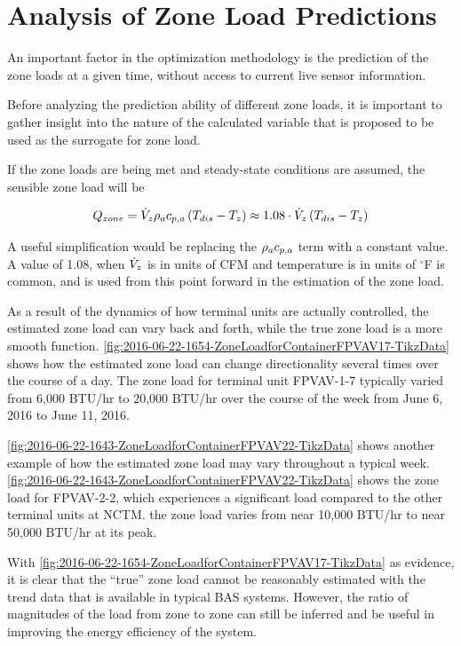 \section{Analysis of Zone Load Predictions}

An important factor in the optimization methodology is the prediction of the zone loads at a given time, without access to current live sensor information. 

Before analyzing the prediction ability of different zone loads, it is important to gather insight into the nature of the calculated variable that is proposed to be used as the surrogate for zone load.   

If the zone loads are being met and steady-state conditions are assumed, the sensible zone load will be

\begin{equation}
    Q_{zone}=\dot{V}_{z} \rho_a c_{p,a}{} \left(T_{dis}-T_{z} \right) \approx 1.08 \cdot \dot{V}_{z}\left(T_{dis}-T_{z} \right)
\end{equation}

A useful simplification would be replacing the \(\rho_a c_{p,a}{}\) term with a constant value. A value of 1.08, when \(\dot{V}_{z}\) is in units of CFM and temperature is in units of \(^\circ\)F is common, and is used from this point forward in the estimation of the zone load.

As a result of the dynamics of how  terminal units are actually controlled, the estimated zone load can vary back and forth, while the true zone load is a more smooth function. \figref{} \ref{fig:2016-06-22-1654-ZoneLoadforContainerFPVAV17-TikzData} shows how the estimated zone load can change directionality several times over the course of a day. The zone load for terminal unit FPVAV-1-7 typically varied from 6,000 BTU/hr to 20,000 BTU/hr over the course of the week from June 6, 2016 to June 11, 2016.

\figref{} \ref{fig:2016-06-22-1643-ZoneLoadforContainerFPVAV22-TikzData} shows another example of how the estimated zone load may vary throughout a typical week. \figref{} \ref{fig:2016-06-22-1643-ZoneLoadforContainerFPVAV22-TikzData} shows the zone load for FPVAV-2-2, which experiences a significant load compared to the other terminal units at NCTM. the zone load varies from near 10,000 BTU/hr to near 50,000 BTU/hr at its peak.

With \figref{} \ref{fig:2016-06-22-1654-ZoneLoadforContainerFPVAV17-TikzData} as evidence, it is clear that the ``true'' zone load cannot be reasonably estimated with the trend data that is available in typical BAS systems. However, the ratio of magnitudes of the load from zone to zone can still be inferred and be useful in improving the energy efficiency of the system.  

